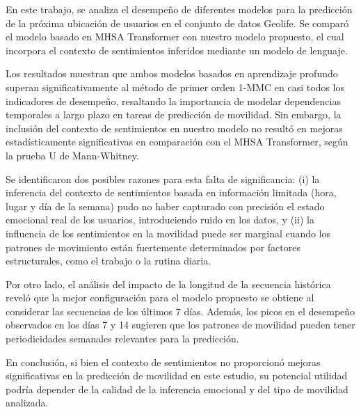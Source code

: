 \begin{conclusions}
    En este trabajo, se analiza el desempeño de diferentes modelos para 
    la predicción de la próxima ubicación de usuarios en el conjunto de 
    datos Geolife. Se comparó el modelo basado en MHSA Transformer con 
    nuestro modelo propuesto, el cual incorpora el contexto de sentimientos 
    inferidos mediante un modelo de lenguaje.

Los resultados muestran que ambos modelos basados en aprendizaje profundo 
superan significativamente al método de primer orden 1-MMC en casi todos 
los indicadores de desempeño, resaltando la importancia de modelar 
dependencias temporales a largo plazo en tareas de predicción de 
movilidad. Sin embargo, la inclusión del contexto de sentimientos en 
nuestro modelo no resultó en mejoras estadísticamente significativas en 
comparación con el MHSA Transformer, según la prueba U de Mann-Whitney.

Se identificaron dos posibles razones para esta falta de significancia: 
(i) la inferencia del contexto de sentimientos basada en información 
limitada (hora, lugar y día de la semana) pudo no haber capturado con 
precisión el estado emocional real de los usuarios, introduciendo ruido 
en los datos, y (ii) la influencia de los sentimientos en la movilidad
puede ser marginal cuando los patrones de movimiento están fuertemente 
determinados por factores estructurales, como el trabajo o la rutina diaria.

Por otro lado, el análisis del impacto de la longitud de la secuencia 
histórica reveló que la mejor configuración para el modelo propuesto 
se obtiene al considerar las secuencias de los últimos 7 días. 
Además, los picos en el desempeño observados en los días 7 y 14 sugieren 
que los patrones de movilidad pueden tener periodicidades semanales 
relevantes para la predicción.

En conclusión, si bien el contexto de sentimientos no proporcionó mejoras 
significativas en la predicción de movilidad en este estudio, su 
potencial utilidad podría depender de la calidad de la inferencia 
emocional y del tipo de movilidad analizada.

\end{conclusions}
